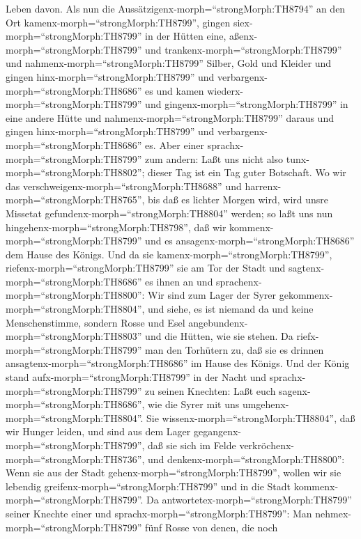 Leben davon.  Als nun die
Aussätzigenx-morph=``strongMorph:TH8794'' an den Ort
kamenx-morph=``strongMorph:TH8799'', gingen
siex-morph=``strongMorph:TH8799'' in der Hütten eine,
aßenx-morph=``strongMorph:TH8799'' und
trankenx-morph=``strongMorph:TH8799'' und
nahmenx-morph=``strongMorph:TH8799'' Silber, Gold und Kleider und gingen
hinx-morph=``strongMorph:TH8799'' und
verbargenx-morph=``strongMorph:TH8686'' es und kamen
wiederx-morph=``strongMorph:TH8799'' und
gingenx-morph=``strongMorph:TH8799'' in eine andere Hütte und
nahmenx-morph=``strongMorph:TH8799'' daraus und gingen
hinx-morph=``strongMorph:TH8799'' und
verbargenx-morph=``strongMorph:TH8686'' es.  Aber einer
sprachx-morph=``strongMorph:TH8799'' zum andern: Laßt uns nicht also
tunx-morph=``strongMorph:TH8802''; dieser Tag ist ein Tag guter
Botschaft. Wo wir das verschweigenx-morph=``strongMorph:TH8688'' und
harrenx-morph=``strongMorph:TH8765'', bis daß es lichter Morgen wird,
wird unsre Missetat gefundenx-morph=``strongMorph:TH8804'' werden; so
laßt uns nun hingehenx-morph=``strongMorph:TH8798'', daß wir
kommenx-morph=``strongMorph:TH8799'' und es
ansagenx-morph=``strongMorph:TH8686'' dem Hause des Königs.
 Und da sie kamenx-morph=``strongMorph:TH8799'',
riefenx-morph=``strongMorph:TH8799'' sie am Tor der Stadt und
sagtenx-morph=``strongMorph:TH8686'' es ihnen an und
sprachenx-morph=``strongMorph:TH8800'': Wir sind zum Lager der Syrer
gekommenx-morph=``strongMorph:TH8804'', und siehe, es ist niemand da und
keine Menschenstimme, sondern Rosse und Esel
angebundenx-morph=``strongMorph:TH8803'' und die Hütten, wie sie stehen.
 Da riefx-morph=``strongMorph:TH8799'' man den Torhütern
zu, daß sie es drinnen ansagtenx-morph=``strongMorph:TH8686'' im Hause
des Königs.  Und der König stand
aufx-morph=``strongMorph:TH8799'' in der Nacht und
sprachx-morph=``strongMorph:TH8799'' zu seinen Knechten: Laßt euch
sagenx-morph=``strongMorph:TH8686'', wie die Syrer mit uns
umgehenx-morph=``strongMorph:TH8804''. Sie
wissenx-morph=``strongMorph:TH8804'', daß wir Hunger leiden, und sind
aus dem Lager gegangenx-morph=``strongMorph:TH8799'', daß sie sich im
Felde verkröchenx-morph=``strongMorph:TH8736'', und
denkenx-morph=``strongMorph:TH8800'': Wenn sie aus der Stadt
gehenx-morph=``strongMorph:TH8799'', wollen wir sie lebendig
greifenx-morph=``strongMorph:TH8799'' und in die Stadt
kommenx-morph=``strongMorph:TH8799''.  Da
antwortetex-morph=``strongMorph:TH8799'' seiner Knechte einer und
sprachx-morph=``strongMorph:TH8799'': Man
nehmex-morph=``strongMorph:TH8799'' fünf Rosse von denen, die noch
